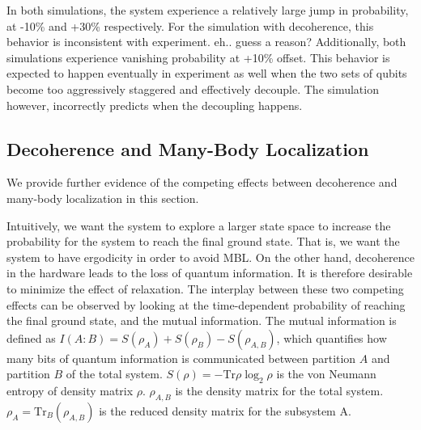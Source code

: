 \documentclass[prd,twocolumn,tightenlines,preprintnumbers,showpacs,superscriptaddress,notitlepage,nofootinbib,eqsecnum,floatfix,longbibliography]{revtex4}
\begin{document}
In both simulations, the system experience a relatively large jump in probability, at -10\% and +30\% respectively.
For the simulation with decoherence, this behavior is inconsistent with experiment.
{\color{red} eh..
guess a reason?} Additionally, both simulations experience vanishing probability at +10\% offset.
This behavior is expected to happen eventually in experiment as well when the two sets of qubits become too aggressively staggered and effectively decouple.
The simulation however, incorrectly predicts when the decoupling happens.

\subsection{Decoherence and Many-Body Localization}

We provide further evidence of the competing effects between decoherence and many-body localization in this section.

Intuitively, we want the system to explore a larger state space to increase the probability for the system to reach the final ground state.
That is, we want the system to have ergodicity in order to avoid MBL.
On the other hand, decoherence in the hardware leads to the loss of quantum information.
It is therefore desirable to minimize the effect of relaxation.
The interplay between these two competing effects can be observed by looking at the time-dependent probability of reaching the final ground state, and the mutual information.
The mutual information is defined as $I(A:B)=S(\rho_A)+S(\rho_B)-S(\rho_{A,B})$, which quantifies how many bits of quantum information is communicated between partition $A$ and partition $B$ of the total system.
$S(\rho)=-\mbox{Tr}\rho \log_2 \rho$ is the von Neumann entropy of density matrix $\rho$.
{\color{blue} $\rho_{A,B}$ is the density matrix for the total system.
$\rho_{A}=\mbox{Tr}_{B} (\rho_{A,B})$ is the reduced density matrix for the subsystem A.}
\end{document}
